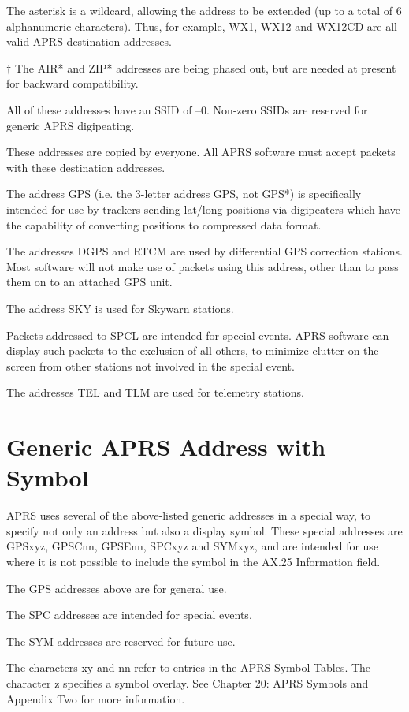 The asterisk is a wildcard, allowing the address to be extended (up to a total
of 6 alphanumeric characters). Thus, for example, WX1, WX12 and WX12CD
are all valid APRS destination addresses.

$\dagger$ The AIR* and ZIP* addresses are being phased out, but are needed at
present for backward compatibility.

All of these addresses have an SSID of –0. Non-zero SSIDs are reserved for
generic APRS digipeating.

These addresses are copied by everyone. All APRS software must accept
packets with these destination addresses.

The address GPS (i.e. the 3-letter address GPS, not GPS*) is specifically
intended for use by trackers sending lat/long positions via digipeaters which
have the capability of converting positions to compressed data format.

The addresses DGPS and RTCM are used by differential GPS correction
stations. Most software will not make use of packets using this address, other
than to pass them on to an attached GPS unit.

The address SKY is used for Skywarn stations.

Packets addressed to SPCL are intended for special events. APRS software
can display such packets to the exclusion of all others, to minimize clutter on
the screen from other stations not involved in the special event.

The addresses TEL and TLM are used for telemetry stations.

\section{Generic APRS Address with Symbol}

APRS uses several of the above-listed generic addresses in a special way, to
specify not only an address but also a display symbol. These special
addresses are \textsf {GPSxyz, GPSCnn, GPSEnn, SPCxyz} and \textsf {SYMxyz}, and are
intended for use where it is not possible to include the symbol in the AX.25
Information field.

The GPS addresses above are for general use.

The SPC addresses are intended for special events.

The SYM addresses are reserved for future use.

The characters \textsf{xy} and \textsf{nn} refer to entries in the APRS Symbol Tables. The
character \textsf{z} specifies a symbol overlay. See Chapter 20: APRS Symbols and
Appendix Two for more information.

